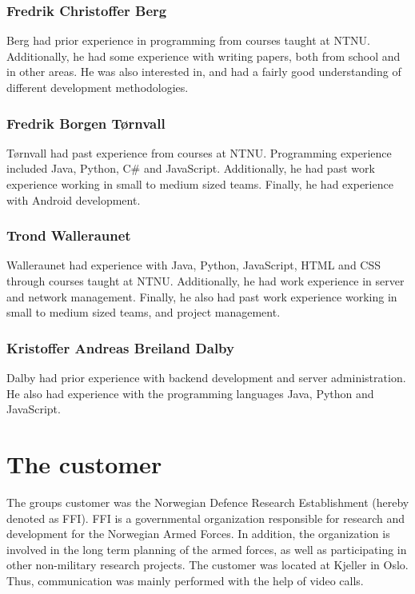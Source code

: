 \subsubsection{Fredrik Christoffer Berg}

Berg had prior experience in programming from courses taught at NTNU. Additionally, he had some experience with writing papers, both from school and in other areas. He was also interested in, and had a fairly good understanding of different development methodologies.

\subsubsection{Fredrik Borgen Tørnvall}
Tørnvall had past experience from courses at NTNU. Programming experience included Java, Python, C\# and JavaScript. Additionally, he had past work experience working in small to medium sized teams. Finally, he had experience with Android development. 

\subsubsection{Trond Walleraunet}
Walleraunet had experience with Java, Python, JavaScript, HTML and CSS through courses taught at NTNU. Additionally, he had work experience in server and network management. Finally, he also had past work experience working in small to medium sized teams, and project management.

\subsubsection{Kristoffer Andreas Breiland Dalby}
Dalby had prior experience with backend development and server administration. He also had experience with the programming languages Java, Python and JavaScript.

\section{The customer}
\label{sec:introduction-the_customer}

The groups customer was the Norwegian Defence Research Establishment (hereby denoted as FFI). FFI is a governmental organization responsible for research and development for the Norwegian Armed Forces. In addition, the organization is involved in the long term planning of the armed forces, as well as participating in other non-military research projects. The customer was located at Kjeller in Oslo. Thus, communication was mainly performed with the help of video calls.


